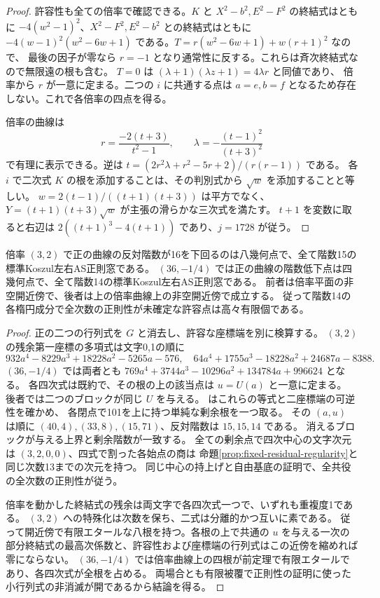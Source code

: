 \begin{proof}
許容性も全ての倍率で確認できる。$K$ と $X^2-b^2,E^2-F^2$ の終結式はともに
$-4(w^2-1)^2$、$X^2-F^2,E^2-b^2$ との終結式はともに
$-4(w-1)^2(w^2-6w+1)$ である。$T=r(w^2-6w+1)+w(r+1)^2$ なので、
最後の因子が零なら $r=-1$ となり通常性に反する。これらは斉次終結式なので無限遠の根も含む。
$T=0$ は $(\lambda+1)(\lambda z+1)=4\lambda r$ と同値であり、
倍率から $r$ が一意に定まる。二つの $i$ に共通する点は
$a=e,b=f$ となるため存在しない。これで各倍率の四点を得る。

倍率の曲線は
\[
 r=\frac{-2(t+3)}{t^2-1},\qquad \lambda=-\frac{(t-1)^2}{(t+3)^2}
\]
で有理に表示できる。逆は $t=(2r^2\lambda+r^2-5r+2)/(r(r-1))$ である。
各 $i$ で二次式 $K$ の根を添加することは、その判別式から $\sqrt w$ を添加することと等しい。
$w=2(t-1)/((t+1)(t+3))$ は平方でなく、$Y=(t+1)(t+3)\sqrt w$ が主張の滑らかな三次式を満たす。
$t+1$ を変数に取ると右辺は $2((t+1)^3-4(t+1))$ であり、$j=1728$ が従う。
\end{proof}

\begin{proposition}\label{prop:fixed-rank-drop-regularity}
倍率 $(3,2)$ で正の曲線の反対階数が16を下回るのは八幾何点で、全て階数15の標準Koszul左右AS正則窓である。
$(36,-1/4)$ では正の曲線の階数低下点は四幾何点で、全て階数14の標準Koszul左右AS正則窓である。
前者は倍率平面の非空開近傍で、後者は上の倍率曲線上の非空開近傍で成立する。
従って階数14の各楕円成分で全次数の正則性が未確定な許容点は高々有限個である。
\end{proposition}
\begin{proof}
正の二つの行列式を $G$ と消去し、許容な座標端を別に検算する。
$(3,2)$ の残余第一座標の多項式は文字0,1の順に
\[
 932a^4-8229a^3+18228a^2-5265a-576,\quad
 64a^4+1755a^3-18228a^2+24687a-8388 .
\]
$(36,-1/4)$ では両者とも $769a^4+3744a^3-10296a^2+134784a+996624$ となる。
各四次式は既約で、その根の上の該当点は $u=U(a)$ と一意に定まる。
後者では二つのブロックが同じ $U$ を与える。
 はこれらの等式と二座標端の可逆性を確かめ、
各閉点で101を上に持つ単純な剰余根を一つ取る。
その $(a,u)$ は順に $(40,4),(33,8),(15,71)$、反対階数は $15,15,14$ である。
消えるブロックが与える上界と剰余階数が一致する。
全ての剰余点で四次中心の文字次元は $(3,2,0,0)$、四式で割った各始点の商は
命題\ref{prop:fixed-residual-regularity}と同じ次数13までの次元を持つ。
同じ中心の持上げと自由基底の証明で、全共役の全次数の正則性が従う。

倍率を動かした終結式の残余は両文字で各四次式一つで、いずれも重複度1である。
$(3,2)$ への特殊化は次数を保ち、二式は分離的かつ互いに素である。
従って開近傍で有限エタールな八根を持つ。各根の上で共通の $u$ を与える一次の
部分終結式の最高次係数と、許容性および座標端の行列式はこの近傍を縮めれば零にならない。
$(36,-1/4)$ では倍率曲線上の四根が前定理で有限エタールであり、各四次式が全根を占める。
両場合とも有限被覆で正則性の証明に使った小行列式の非消滅が開であるから結論を得る。
\end{proof}
